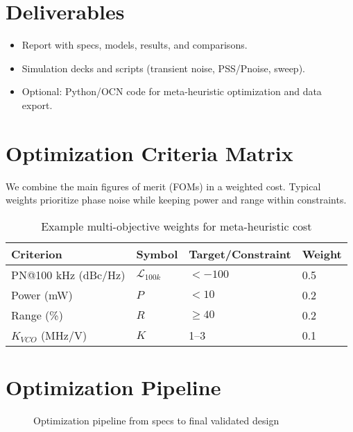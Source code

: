 \section{Deliverables}
\begin{itemize}
  \item Report with specs, models, results, and comparisons.
  \item Simulation decks and scripts (transient noise, PSS/Pnoise, sweep).
  \item Optional: Python/OCN code for meta-heuristic optimization and data export.
\end{itemize}

\section{Optimization Criteria Matrix}
We combine the main figures of merit (FOMs) in a weighted cost. Typical weights prioritize phase noise while keeping power and range within constraints.
\begin{table}[H]
  \centering
  \begin{tabular}{llll}
    \toprule
    Criterion & Symbol & Target/Constraint & Weight \\
    \midrule
    PN@100 kHz (dBc/Hz) & $\mathcal{L}_{100k}$ & $< -100$ & 0.5 \\
    Power (mW) & $P$ & $< 10$ & 0.2 \\
    Range (\%) & $R$ & $\ge 40$ & 0.2 \\
    $K_{VCO}$ (MHz/V) & $K$ & 1–3 & 0.1 \\
    \bottomrule
  \end{tabular}
  \caption{Example multi-objective weights for meta-heuristic cost}
\end{table}

\section{Optimization Pipeline}
\begin{figure}[H]
  \centering
  \caption{Optimization pipeline from specs to final validated design}
\end{figure}


